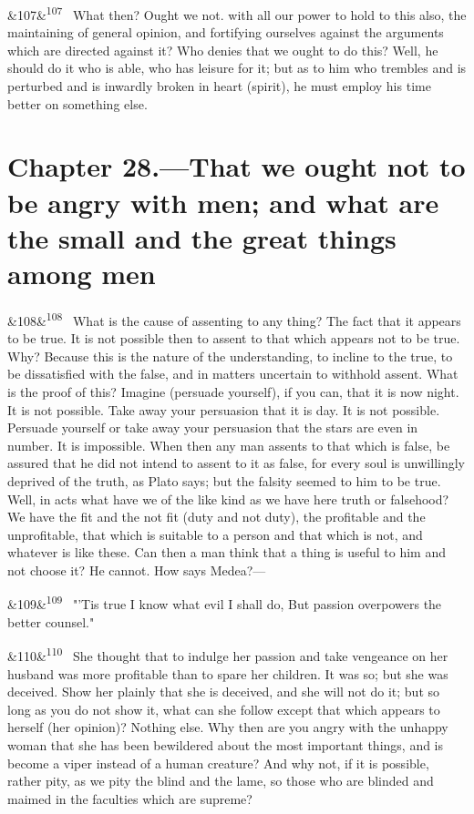 \documentclass[12pt]{article}
\newcommand{\para}[1][]{\par\noindent\ifx&#1&\else\textsuperscript{\footnotesize #1}~\fi}
\begin{document}
\para[107] What then? Ought we not. with all our power to hold to this also, the maintaining of general opinion, and fortifying ourselves against the arguments which are directed against it? Who denies that we ought to do this? Well, he should do it who is able, who has leisure for it; but as to him who trembles and is perturbed and is inwardly broken in heart (spirit), he must employ his time better on something else.

\section*{Chapter 28.---That we ought not to be angry with men; and what are the small and the great things among men}

\para[108] What is the cause of assenting to any thing? The fact that it appears to be true. It is not possible then to assent to that which appears not to be true. Why? Because this is the nature of the understanding, to incline to the true, to be dissatisfied with the false, and in matters uncertain to withhold assent. What is the proof of this? Imagine (persuade yourself), if you can, that it is now night. It is not possible. Take away your persuasion that it is day. It is not possible. Persuade yourself or take away your persuasion that the stars are even in number. It is impossible. When then any man assents to that which is false, be assured that he did not intend to assent to it as false, for every soul is unwillingly deprived of the truth, as Plato says; but the falsity seemed to him to be true. Well, in acts what have we of the like kind as we have here truth or falsehood? We have the fit and the not fit (duty and not duty), the profitable and the unprofitable, that which is suitable to a person and that which is not, and whatever is like these. Can then a man think that a thing is useful to him and not choose it? He cannot. How says Medea?—

\para[109] "'Tis true I know what evil I shall do, But passion overpowers the better counsel."

\para[110] She thought that to indulge her passion and take vengeance on her husband was more profitable than to spare her children. It was so; but she was deceived. Show her plainly that she is deceived, and she will not do it; but so long as you do not show it, what can she follow except that which appears to herself (her opinion)? Nothing else. Why then are you angry with the unhappy woman that she has been bewildered about the most important things, and is become a viper instead of a human creature? And why not, if it is possible, rather pity, as we pity the blind and the lame, so those who are blinded and maimed in the faculties which are supreme?
\end{document}
